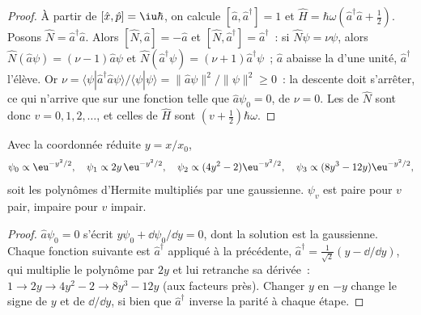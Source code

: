 \begin{proof}
À partir de $[\hat x,\hat p] = \iu\hbar$, on calcule $[\hat a,\hat a^\dagger] = 1$ et
$\hat H = \hbar\omega(\hat a^\dagger\hat a + \frac12)$. Posons $\hat N =
\hat a^\dagger\hat a$. Alors $[\hat N,\hat a] = -\hat a$ et $[\hat N,\hat
a^\dagger] = \hat a^\dagger$~: si $\hat N\psi = \nu\psi$, alors $\hat N(\hat
a\psi) = (\nu - 1)\hat a\psi$ et $\hat N(\hat a^\dagger\psi) = (\nu + 1)\hat
a^\dagger\psi$~; $\hat a$ abaisse la  d'une unité, $\hat a^\dagger$
l'élève. Or $\nu = \langle\psi|\hat a^\dagger\hat a\psi\rangle/\langle\psi|\psi
\rangle = \|\hat a\psi\|^2/\|\psi\|^2 \ge 0$~: la descente doit s'arrêter, ce
qui n'arrive que sur une fonction telle que $\hat a\psi_0 = 0$, de  $\nu = 0$. Les  de $\hat N$ sont donc
$v = 0, 1, 2, \dots$, et celles de
$\hat H$ sont $(v + \frac12)\hbar\omega$.
\end{proof}

\begin{proposition}\label{prop:b3:quantum-model-systems:oscillator-functions}
Avec la coordonnée réduite $y = x/x_0$,
\[
\psi_0 \propto \eu^{-y^2/2}, \quad \psi_1 \propto 2y\,\eu^{-y^2/2}, \quad
\psi_2 \propto (4y^2 - 2)\eu^{-y^2/2}, \quad \psi_3 \propto (8y^3 -
12y)\eu^{-y^2/2},
\]
soit les polynômes d'Hermite multipliés par une gaussienne. $\psi_v$ est
paire pour $v$ pair, impaire pour $v$ impair.
\end{proposition}

\begin{proof}
$\hat a\psi_0 = 0$ s'écrit $y\psi_0 + \dd\psi_0/\dd y = 0$, dont la solution est
la gaussienne. Chaque fonction suivante est $\hat a^\dagger$ appliqué à la
précédente, $\hat a^\dagger = \frac{1}{\sqrt2}(y - \dd/\dd y)$, qui multiplie
le polynôme par $2y$ et lui retranche sa dérivée~: $1 \to 2y \to 4y^2 - 2 \to
8y^3 - 12y$ (aux facteurs près). Changer $y$ en $-y$ change le signe de $y$
et de $\dd/\dd y$, si bien que $\hat a^\dagger$ inverse la parité à chaque
étape.
\end{proof}

